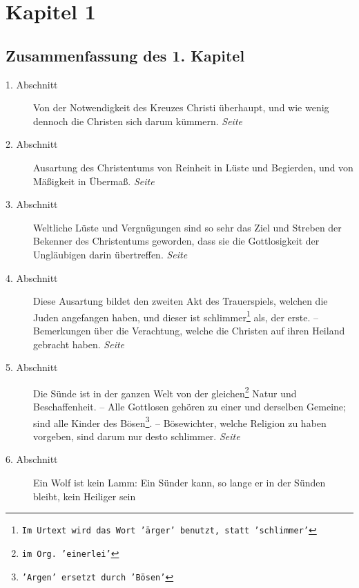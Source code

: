 

\chapter{Kapitel 1} \label{kap1}



\section{Zusammenfassung des 1. Kapitel}


\begin{description}
\item[1. Abschnitt] Von der Notwendigkeit des Kreuzes Christi überhaupt, und
wie wenig dennoch die Christen sich darum kümmern.
\dotfill \textit{Seite~\pageref{kap1_ab1}}\\
\item[2. Abschnitt] Ausartung des Christentums von Reinheit in Lüste und
Begierden, und von Mäßigkeit in Übermaß.
\dotfill \textit{Seite~\pageref{kap1_ab2}}\\
\item[3. Abschnitt] Weltliche Lüste und Vergnügungen sind so sehr das Ziel und
Streben der Bekenner des Christentums geworden, dass sie die Gottlosigkeit der
Ungläubigen darin übertreffen.
\dotfill \textit{Seite~\pageref{kap1_ab3}}\\
\item[4. Abschnitt] Diese Ausartung bildet den zweiten Akt des Trauerspiels,
welchen die Juden angefangen haben, und dieser ist schlimmer\footnote{\texttt{Im Urtext
wird das Wort 'ärger' benutzt, statt 'schlimmer'}} als, der erste. --
Bemerkungen über die Verachtung, welche die Christen auf ihren Heiland gebracht
haben.
\dotfill \textit{Seite~\pageref{kap1_ab4}}\\
\item[5. Abschnitt] Die Sünde ist in der ganzen Welt von der
gleichen\footnote{\texttt{im Org. 'einerlei'}} Natur und Beschaffenheit. -- Alle
Gottlosen gehören zu einer und derselben Gemeine;
sind alle Kinder des Bösen\footnote{\texttt{'Argen' ersetzt durch 'Bösen'}}. --
Bösewichter, welche Religion zu haben vorgeben, sind darum nur desto schlimmer.
\dotfill \textit{Seite~\pageref{kap1_ab5}}\\
\item[6. Abschnitt] Ein Wolf ist kein Lamm: Ein Sünder kann, so lange er in der
Sünden bleibt, kein Heiliger sein

\end{description}
